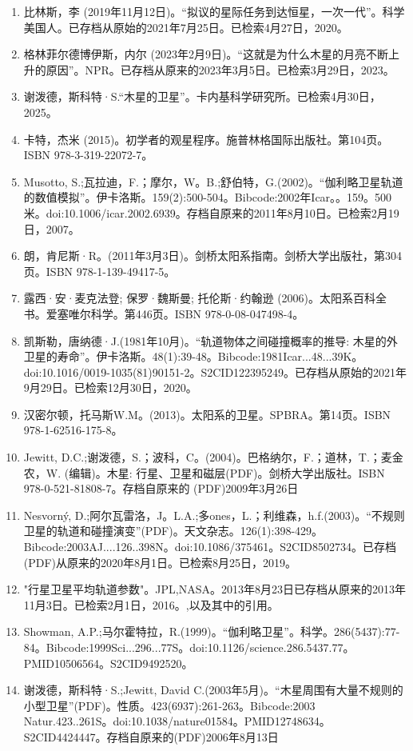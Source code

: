 \begin{enumerate}
\item 比林斯，李 (2019年11月12日)。“拟议的星际任务到达恒星，一次一代”。科学美国人。已存档从原始的2021年7月25日。已检索4月27日，2020。
\item 格林菲尔德博伊斯，内尔 (2023年2月9日)。“这就是为什么木星的月亮不断上升的原因”。NPR。已存档从原来的2023年3月5日。已检索3月29日，2023。
\item 谢泼德，斯科特·S.“木星的卫星”。卡内基科学研究所。已检索4月30日，2025。
\item 卡特，杰米 (2015)。初学者的观星程序。施普林格国际出版社。第104页。ISBN 978-3-319-22072-7。
\item Musotto, S.;瓦拉迪，F.；摩尔，W。B.;舒伯特，G.(2002)。“伽利略卫星轨道的数值模拟”。伊卡洛斯。159(2):500-504。Bibcode:2002年Icar。。159。500米。doi:10.1006/icar.2002.6939。存档自原来的2011年8月10日。已检索2月19日，2007。
\item 朗，肯尼斯·R。(2011年3月3日)。剑桥太阳系指南。剑桥大学出版社，第304页。ISBN 978-1-139-49417-5。
\item 露西·安·麦克法登; 保罗·魏斯曼; 托伦斯·约翰逊 (2006)。太阳系百科全书。爱塞唯尔科学。第446页。ISBN 978-0-08-047498-4。
\item 凯斯勒，唐纳德·J.(1981年10月)。“轨道物体之间碰撞概率的推导: 木星的外卫星的寿命”。伊卡洛斯。48(1):39-48。Bibcode:1981Icar...48...39K。doi:10.1016/0019-1035(81)90151-2。S2CID122395249。已存档从原始的2021年9月29日。已检索12月30日，2020。 
\item 汉密尔顿，托马斯W.M。(2013)。太阳系的卫星。SPBRA。第14页。ISBN 978-1-62516-175-8。
\item Jewitt, D.C.;谢泼德，S.；波科，C。(2004)。巴格纳尔，F.；道林，T.；麦金农，W. (编辑)。木星: 行星、卫星和磁层(PDF)。剑桥大学出版社。ISBN  978-0-521-81808-7。存档自原来的 (PDF)2009年3月26日
\item Nesvorný, D.;阿尔瓦雷洛，J。L.A.;多ones，L.；利维森，h.f.(2003)。“不规则卫星的轨道和碰撞演变”(PDF)。天文杂志。126(1):398-429。Bibcode:2003AJ....126..398N。doi:10.1086/375461。S2CID8502734。已存档(PDF)从原来的2020年8月1日。已检索8月25日，2019。  
\item "行星卫星平均轨道参数"。JPL,NASA。2013年8月23日已存档从原来的2013年11月3日。已检索2月1日，2016。,以及其中的引用。
\item Showman, A.P.;马尔霍特拉，R.(1999)。“伽利略卫星”。科学。286(5437):77-84。Bibcode:1999Sci...296...77S。doi:10.1126/science.286.5437.77。PMID10506564。S2CID9492520。  
\item 谢泼德，斯科特·S.;Jewitt, David C.(2003年5月)。“木星周围有大量不规则的小型卫星”(PDF)。性质。423(6937):261-263。Bibcode:2003 Natur.423..261S。doi:10.1038/nature01584。PMID12748634。S2CID4424447。存档自原来的(PDF)2006年8月13日   

\end{enumerate}
